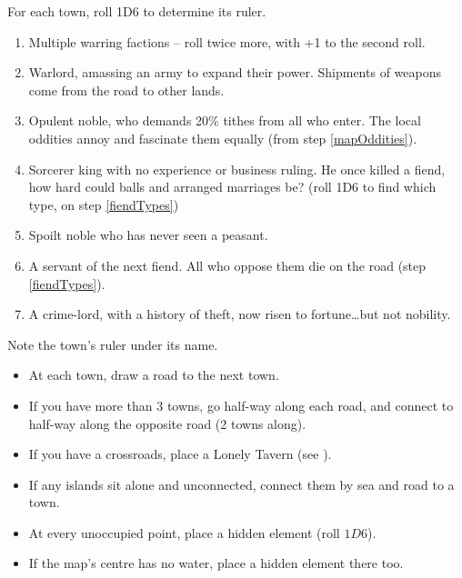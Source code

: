 \begin{multicols}{2}

For each town, roll 1D6 to determine its ruler.

\begin{enumerate}
\item
  Multiple warring factions -- roll twice more, with +1 to the second roll.
\item
  Warlord, amassing an army to expand their power.
  Shipments of weapons come from the road to other lands.
\item
  Opulent noble, who demands 20\% tithes from all who enter.
  The local oddities annoy and fascinate them equally (from step \ref{mapOddities}).
\item
  Sorcerer king with no experience or business ruling.
  He once killed a fiend, how hard could balls and arranged marriages be?
  (roll 1D6 to find which type, on step \ref{fiendTypes})
\item
  Spoilt noble who has never seen a peasant.
\item
  A servant of the next fiend.
  All who oppose them die on the road (step \ref{fiendTypes}).
\item
  A crime-lord, with a history of theft, now risen to fortune\ldots but not nobility.
\end{enumerate}

Note the town's ruler under its name.


\begin{itemize}
\item
  At each town, draw a road to the next town.
\item
  If you have more than 3 towns, go half-way along each road, and
  connect to half-way along the opposite road (2 towns along).
\item
  If you have a crossroads, place a Lonely Tavern (see ).
\item
  If any islands sit alone and unconnected, connect them by sea and road to a town.
\end{itemize}

\label{mapOddities}

\begin{itemize}
  \item
  At every unoccupied point, place a hidden element (roll $1D6$).
  \item
  If the map's centre has no water, place a hidden element there too.
\end{itemize}


\end{multicols}
